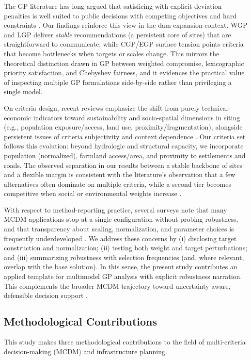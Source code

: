 The GP literature has long argued that satisficing with explicit deviation penalties is well suited to public decisions with competing objectives and hard constraints \cite{jones2010}. Our findings reinforce this view in the dam expansion context. WGP and LGP deliver \textit{stable} recommendations (a persistent core of sites) that are straightforward to communicate, while CGP/EGP surface tension points criteria that become bottlenecks when targets or scales change. This mirrors the theoretical distinction drawn in GP between weighted compromise, lexicographic priority satisfaction, and Chebyshev fairness, and it evidences the practical value of inspecting multiple GP formulations side-by-side rather than privileging a single model.

On criteria design, recent reviews emphasize the shift from purely technical-economic indicators toward sustainability and socio-spatial dimensions in siting (e.g., population exposure/access, land use, proximity/fragmentation), alongside persistent issues of criteria subjectivity and context dependence \cite{KUMAR2017596,Aruldoss2013}. Our criteria set follows this evolution: beyond hydrologic and structural capacity, we incorporate population (normalized), farmland access/area, and proximity to settlements and roads. The observed separation in our results between a stable backbone of sites and a flexible margin is consistent with the literature's observation that a few alternatives often dominate on multiple criteria, while a second tier becomes competitive when social or environmental weights increase \cite{Aruldoss2013}.

With respect to method-reporting practice, several surveys note that many \gls{MCDM} applications stop at a single configuration without probing robustness, and that transparency about scaling, normalization, and parameter choices is frequently underdeveloped \cite{Aruldoss2013}. We address these concerns by (i) disclosing target construction and normalization; (ii) testing both weight and target perturbations; and (iii) summarizing robustness with selection frequencies (and, where relevant, overlap with the base solution). In this sense, the present study contributes an applied template for multimodel GP analysis with explicit robustness narration. This complements the broader \gls{MCDM} trajectory toward uncertainty-aware, defensible decision support \cite{jones2010,Mardani2015}.

\subsection{Methodological Contributions}
This study makes three methodological contributions to the field of multi-criteria decision-making (\gls{MCDM}) and infrastructure planning. 

